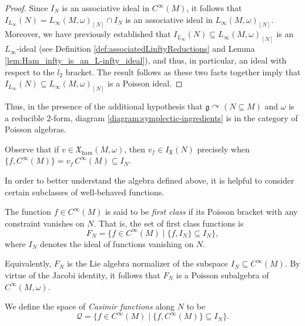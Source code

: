 \documentclass[pdftex]{sigma}
\numberwithin{equation}{section}
\newcommand{\g}{\mathfrak{g}}
\newcommand{\ham}{\text{ham}}
\newcommand{\X}{\mathfrak{X}}
\renewcommand{\subset}{\subseteq}
\begin{document}
\begin{proof}
	Since $I_N$ is an associative ideal in $C^\infty(M)$, it follows that $I_{L_\infty}(N) = L_\infty(M,\omega)_{[N]}\cap I_N$ is an associative ideal in $L_\infty(M,\omega)_{[N]}$. Moreover, we have previously established that $I_{L_\infty}(N)\subset L_\infty(M,\omega)_{[N]}$ is an $L_\infty$-ideal (see Definition \ref{def:associatedLinftyReductions} and Lemma \ref{lem:Ham_infty_is_an_L-infty_ideal}), and thus, in particular, an ideal with respect to the $l_2$ bracket. The result follows as these two facts together imply that $I_{L_\infty}(N)\subset L_\infty(M,\omega)_{[N]}$ is a Poisson ideal.
\end{proof}

Thus, in  the presence of the additional hypothesis that $\g\curvearrowright(N\subset M)$ and $\omega$ is a reducible $2$-form, diagram \eqref{diagram:symplectic-ingredients} is in the category of Poisson algebras.

\begin{Remark}\label{rem:comparingAlongN}
	Observe that if $v\in\X_\ham(M,\omega)$, then $v_f \in I_{\mathfrak{X}}(N)$ precisely when $\{f, C^\infty(M)\} = v_f\, C^\infty(M)\subset I_N$.
\end{Remark}

In order to better understand the algebra defined above, it is helpful to consider certain subclasses of well-behaved functions.
\begin{Definition}\label{def:IclassFunc}
	The function $f\in C^\infty(M)$ is said to be \emph{first class} if its Poisson bracket with any constraint vanishes on $N$. That is, the set of first class functions is
	\[
	 F_N =
		\lbrace
 		f \in C^\infty(M)
 		\mid
		\lbrace f, I_N \rbrace \subset I_N
		\rbrace,
	\]
	where $I_N$ denotes the ideal of functions vanishing on $N$.
\end{Definition}

Equivalently, $F_N$ is the Lie algebra normalizer of the subspace $I_N\subset C^\infty(M)$.
By virtue of the Jacobi identity, it follows that $F_N$ is a Poisson subalgebra of $C^\infty(M,\omega)$.


\begin{Definition}\label{def:Casimir_function}
	We define the space of \emph{Casimir functions} along $N$ to be
	\begin{equation}\label{eq:calQ}
	 \mathcal{Q}=
		\lbrace
			f \in C^\infty(M)
		 \mid
			\{ f, C^\infty(M)\} \subset I_N
		\rbrace	
		.
	\end{equation}
\end{Definition}
\end{document}
